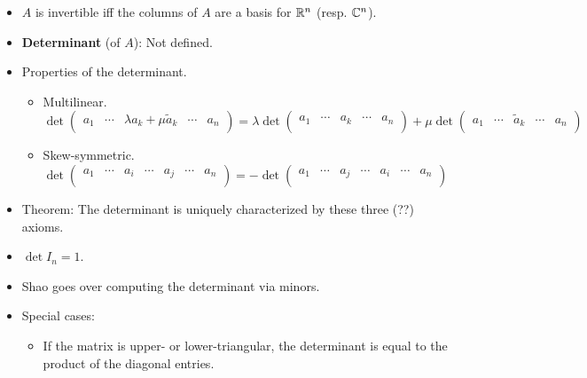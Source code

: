 \documentclass[../notes.tex]{subfiles}
\begin{document}
\begin{itemize}
    \item $A$ is invertible iff the columns of $A$ are a basis for $\mathbb{R}^n$ (resp. $\mathbb{C}^n$).
    \item \textbf{Determinant} (of $A$): Not defined.
    \item Properties of the determinant.
    \begin{itemize}
        \item Multilinear.
        \begin{equation*}
            \det
            \begin{pmatrix}
                a_1 & \cdots & \lambda a_k+\mu\tilde{a}_k & \cdots & a_n\\
            \end{pmatrix}
            = \lambda\det
            \begin{pmatrix}
                a_1 & \cdots & a_k & \cdots & a_n\\
            \end{pmatrix}
            +\mu\det
            \begin{pmatrix}
                a_1 & \cdots & \tilde{a}_k & \cdots & a_n\\
            \end{pmatrix}
        \end{equation*}
        \item Skew-symmetric.
        \begin{equation*}
            \det
            \begin{pmatrix}
                a_1 & \cdots & a_i & \cdots & a_j & \cdots & a_n\\
            \end{pmatrix}
            = -\det
            \begin{pmatrix}
                a_1 & \cdots & a_j & \cdots & a_i & \cdots & a_n\\
            \end{pmatrix}
        \end{equation*}
    \end{itemize}
    \item Theorem: The determinant is uniquely characterized by these three (??) axioms.
    \item $\det I_n=1$.
    \item Shao goes over computing the determinant via minors.
    \item Special cases:
    \begin{itemize}
        \item If the matrix is upper- or lower-triangular, the determinant is equal to the product of the diagonal entries.

\end{itemize}
\end{itemize}
\end{document}
